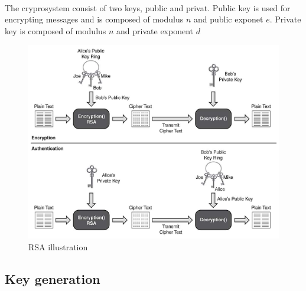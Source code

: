\documentclass[thesis=B,english]{FITthesis}[2012/10/20]
\begin{document}
\paragraph*{}
{The cryprosystem consist of two keys, public and privat. Public key is used for encrypting messages and is composed of modulus \(n\) and public exponet \(e\). Private key is composed of modulus \(n\) and private exponent \(d\)

\begin{figure}
\includegraphics[scale=0.3]{rsa-principle.jpg}
\caption{RSA illustration\cite{img1}
} 
\end{figure}

}





\subsection{Key generation}
\end{document}
